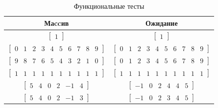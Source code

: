 \documentclass[12pt, a4paper]{report}
\begin{document}
	\begin{table}[ht!]
		\caption{Функциональные тесты}
		\label{unit-tests}
		\begin{center}
			\begin{tabular}{|c|c|}
			\hline
			\bf{Маccив} & \bf{Ожидание}\\\hline
			
			$\begin{bmatrix}1\end{bmatrix}$ &
			$\begin{bmatrix}1\end{bmatrix}$\\\hline
			
			$\begin{bmatrix}0 & 1 & 2 & 3 & 4 & 5 & 6 & 7 & 8 & 9\end{bmatrix}$ &
			$\begin{bmatrix}0 & 1 & 2 & 3 & 4 & 5 & 6 & 7 & 8 & 9\end{bmatrix}$\\\hline
			
			$\begin{bmatrix}9 & 8 & 7 & 6 & 5 & 4 & 3 & 2 & 1 & 0\end{bmatrix}$ &
			$\begin{bmatrix}0 & 1 & 2 & 3 & 4 & 5 & 6 & 7 & 8 & 9\end{bmatrix}$\\\hline
			
			$\begin{bmatrix}1 & 1 & 1 & 1 & 1 & 1 & 1 & 1 & 1 & 1\end{bmatrix}$ &
			$\begin{bmatrix}1 & 1 & 1 & 1 & 1 & 1 & 1 & 1 & 1 & 1\end{bmatrix}$\\\hline
			
			$\begin{bmatrix}5 & 4 & 0 & 2 & -1 & 4\end{bmatrix}$ &
			$\begin{bmatrix}-1 & 0 & 2 & 4 & 4 & 5\end{bmatrix}$\\\hline
			
			$\begin{bmatrix}5 & 4 & 0 & 2 & -1 & 3\end{bmatrix}$ &
			$\begin{bmatrix}-1 & 0 & 2 & 3 & 4 & 5\end{bmatrix}$\\\hline

			\end{tabular}
		\end{center}
	\end{table}
\end{document}
